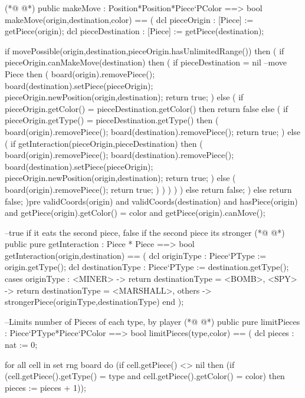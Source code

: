 \begin{vdmpp}[breaklines=true]
(*@
\label{makeMove:83}
@*)
  public makeMove : Position*Position*Piece`PColor ==> bool
  makeMove(origin,destination,color) == 
  (
   dcl pieceOrigin : [Piece] := getPiece(origin);
   dcl pieceDestination : [Piece] := getPiece(destination);
   
   
   if movePossible(origin,destination,pieceOrigin.hasUnlimitedRange())
   then (
    if pieceOrigin.canMakeMove(destination) 
     then (
      if pieceDestination = nil --move Piece
       then (
         board(origin).removePiece();
         board(destination).setPiece(pieceOrigin);
         pieceOrigin.newPosition(origin,destination);
         return true;
        )
        else (
         if  pieceOrigin.getColor() = pieceDestination.getColor() 
          then return false
         else (
          if pieceOrigin.getType() = pieceDestination.getType()
           then (
            board(origin).removePiece();
            board(destination).removePiece();
            return true;
           )
           else (
            if getInteraction(pieceOrigin,pieceDestination)
            then (
             board(origin).removePiece();
             board(destination).removePiece();
             board(destination).setPiece(pieceOrigin);
             pieceOrigin.newPosition(origin,destination);
             return true;
            )
            else (
             board(origin).removePiece();
             return true;
            )
           )
         )
       )
     )
      else return false;
    )
    else return false;
  )pre validCoords(origin) and validCoords(destination) and hasPiece(origin) and getPiece(origin).getColor() = color and getPiece(origin).canMove();
  
 --true if it eats the second piece, false if the second piece its stronger
(*@
\label{getInteraction:134}
@*)
  public pure getInteraction : Piece * Piece ==> bool
 getInteraction(origin,destination) == 
 (
  dcl originType : Piece`PType := origin.getType();
  dcl destinationType : Piece`PType := destination.getType();
  cases originType :
  <MINER> -> return destinationType = <BOMB>,
  <SPY> -> return destinationType = <MARSHALL>,
  others -> strongerPiece(originType,destinationType)
  end
 );
 
 --Limits number of Pieces of each type, by player
(*@
\label{limitPieces:147}
@*)
 public pure limitPieces : Piece`PType*Piece`PColor ==> bool
 limitPieces(type,color) == 
 (
  dcl pieces : nat := 0;
  
  for all cell in set rng board do 
   (if cell.getPiece() <> nil 
    then 
     (if (cell.getPiece().getType() = type and cell.getPiece().getColor() = color) 
      then pieces := pieces + 1));
  

\end{vdmpp}
